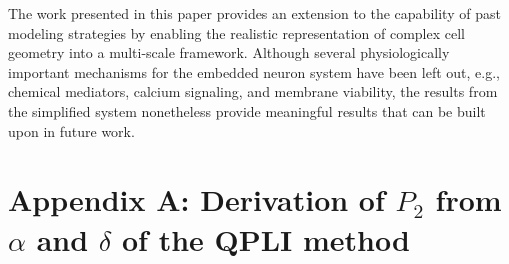 \documentclass[]{interact}
\newcommand{\red}[1]{\textcolor{red}{[#1]}}
\begin{document}
The work presented in this paper provides an extension to the capability of past modeling strategies by enabling the realistic representation of complex cell geometry into a multi-scale framework. Although several physiologically important mechanisms for the embedded neuron system have been left out, e.g., chemical mediators, calcium signaling, and membrane viability, the results from the simplified system nonetheless provide meaningful results that can be built upon in future work. 


%
\newpage





\appendix
\section*{Appendix A: Derivation of $P_2$ from $\alpha$ and $\delta$ of the QPLI method}
\label{app:P2_derivation}
\end{document}
